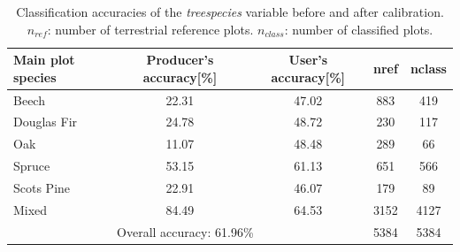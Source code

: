 \begin{table}[H]
	\begin{center}
		\caption{Classification accuracies of the \textit{treespecies} variable before and after calibration. $n_{ref}$: number of terrestrial reference plots. $n_{class}$: number of classified plots.}
		\vspace{0.2cm}
		\label{tab:classacc}
		{\small %
			\begin{tabular}{l|c|c|c|c} %
				\hlineB{1}
				Main plot species & Producer's accuracy[\%] & User's accuracy[\%] & nref & nclass \\
				\hline \hline	
				Beech       & 22.31 & 47.02 & 883 & 419 \\
				Douglas Fir & 24.78 & 48.72 & 230 & 117 \\
				Oak         & 11.07 & 48.48 & 289 & 66 \\
				Spruce      & 53.15 & 61.13 & 651 & 566 \\
				Scots Pine  & 22.91 & 46.07 & 179 & 89 \\
				Mixed       & 84.49 & 64.53 & 3152 & 4127 \\
				\hline
				& \multicolumn{2}{l|}{Overall accuracy: 61.96\%} & 5384 & 5384 \\
				\hline \hline
			\end{tabular}
		}%
	\end{center}
\end{table}


